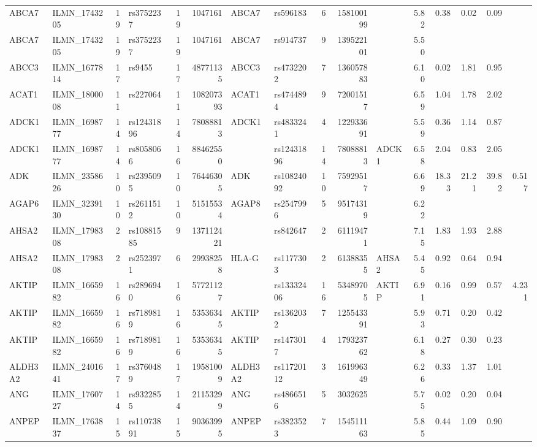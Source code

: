 \documentclass{article}
\begin{document}
\begin{landscape}
{\begin{ThreePartTable}
\begin{longtable}{|llr|lrrl|lrrl|rrrr|r|}
ABCA7 & ILMN\_1743205 & 19 & rs3752237 & 19 & 1047161 & ABCA7 & rs596183 & 6 & 158100199 &  & 5.82 & 0.38\tnote{i} & 0.02\tnote{i} & 0.09\tnote{j} &  \\
  ABCA7 & ILMN\_1743205 & 19 & rs3752237 & 19 & 1047161 & ABCA7 & rs914737 & 9 & 139522101 &  & 5.50 &  &  &  &  \\
  ABCC3 & ILMN\_1677814 & 17 & rs9455 & 17 & 48771135 & ABCC3 & rs4732202 & 7 & 136057883 &  & 6.10 & 0.02 & 1.81 & 0.95 &  \\
  ACAT1 & ILMN\_1800008 & 11 & rs227064 & 11 & 108207393 & ACAT1 & rs4744894 & 9 & 72001517 &  & 6.59 & 1.04 & 1.78 & 2.02 &  \\
  ADCK1 & ILMN\_1698777 & 14 & rs12431896 & 14 & 78088813 & ADCK1 & rs4833241 & 4 & 122933691 &  & 5.59 & 0.36 & 1.14 & 0.87 &  \\
  ADCK1 & ILMN\_1698777 & 14 & rs8058066 & 16 & 88462550 &  & rs12431896 & 14 & 78088813 & ADCK1 & 6.58 & 2.04 & 0.83 & 2.05 &  \\
  ADK & ILMN\_2358626 & 10 & rs2395095 & 10 & 76446305 & ADK & rs10824092 & 10 & 75929517 &  & 6.69 & 18.33 & 21.21 & 39.82 & 0.517 \\
  AGAP6 & ILMN\_3239130 & 10 & rs2611512 & 10 & 51515534 & AGAP8 & rs2547996 & 5 & 95174319 &  & 6.22 &  &  &  &  \\
  AHSA2 & ILMN\_1798308 & 2 & rs10881585 & 9 & 137112421 &  & rs842647 & 2 & 61119471 &  & 7.15 & 1.83 & 1.93 & 2.88 &  \\
  AHSA2 & ILMN\_1798308 & 2 & rs2523971 & 6 & 29938258 & HLA-G & rs1177303 & 2 & 61388355 & AHSA2 & 5.45 & 0.92 & 0.64 & 0.94 &  \\
  AKTIP & ILMN\_1665982 & 16 & rs2896940 & 16 & 57721127 &  & rs13332406 & 16 & 53489705 & AKTIP & 6.91 & 0.16 & 0.99 & 0.57 & 4.231 \\
  AKTIP & ILMN\_1665982 & 16 & rs7189819 & 16 & 53536345 & AKTIP & rs1362032 & 7 & 125543391 &  & 5.93 & 0.71 & 0.20 & 0.42 &  \\
  AKTIP & ILMN\_1665982 & 16 & rs7189819 & 16 & 53536345 & AKTIP & rs1473017 & 4 & 179323762 &  & 6.18 & 0.27 & 0.30 & 0.23 &  \\
  ALDH3A2 & ILMN\_2401641 & 17 & rs3760489 & 17 & 19581009 & ALDH3A2 & rs11720112 & 3 & 161996349 &  & 6.26 & 0.33 & 1.37 & 1.01 &  \\
  ANG & ILMN\_1760727 & 14 & rs9322855 & 14 & 21153299 & ANG & rs4866516 & 5 & 3032625 &  & 5.75 & 0.02 & 0.20 & 0.04 &  \\
  ANPEP & ILMN\_1763837 & 15 & rs11073891 & 15 & 90363995 & ANPEP & rs3823523 & 7 & 154511163 &  & 5.85 & 0.44 & 1.09 & 0.90 &  \\

\end{longtable}
\end{ThreePartTable}}
\end{landscape}
\end{document}
